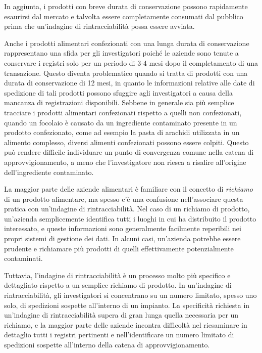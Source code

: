 In aggiunta, i prodotti con breve durata di conservazione possono rapidamente esaurirsi dal mercato e talvolta essere completamente consumati dal pubblico prima che un'indagine di rintracciabilità possa essere avviata.

Anche i prodotti alimentari confezionati con una lunga durata di conservazione rappresentano una sfida per gli investigatori poiché le aziende sono tenute a conservare i registri solo per un periodo di 3-4 mesi dopo il completamento di una transazione. Questo diventa problematico quando si tratta di prodotti con una durata di conservazione di 12 mesi, in quanto le informazioni relative alle date di spedizione di tali prodotti possono sfuggire agli investigatori a causa della mancanza di registrazioni disponibili. Sebbene in generale sia più semplice tracciare i prodotti alimentari confezionati rispetto a quelli non confezionati, quando un focolaio è causato da un ingrediente contaminato presente in un prodotto confezionato, come ad esempio la pasta di arachidi utilizzata in un alimento complesso, diversi alimenti confezionati possono essere colpiti. Questo può rendere difficile individuare un punto di convergenza comune nella catena di approvvigionamento, a meno che l'investigatore non riesca a risalire all'origine dell'ingrediente contaminato.

La maggior parte delle aziende alimentari è familiare con il concetto di \textit{richiamo} di un prodotto alimentare, ma spesso c'è una confusione nell'associare questa pratica con un'indagine di rintracciabilità. Nel caso di un richiamo di prodotto, un'azienda semplicemente identifica tutti i luoghi in cui ha distribuito il prodotto interessato, e queste informazioni sono generalmente facilmente reperibili nei propri sistemi di gestione dei dati. In alcuni casi, un'azienda potrebbe essere prudente e richiamare più prodotti di quelli effettivamente potenzialmente contaminati.

Tuttavia, l'indagine di rintracciabilità è un processo molto più specifico e dettagliato rispetto a un semplice richiamo di prodotto. In un'indagine di rintracciabilità, gli investigatori si concentrano su un numero limitato, spesso uno solo, di spedizioni sospette all'interno di un impianto. La specificità richiesta in un'indagine di rintracciabilità supera di gran lunga quella necessaria per un richiamo, e la maggior parte delle aziende incontra difficoltà nel riesaminare in dettaglio tutti i registri pertinenti e nell'identificare un numero limitato di spedizioni sospette all'interno della catena di approvvigionamento.

